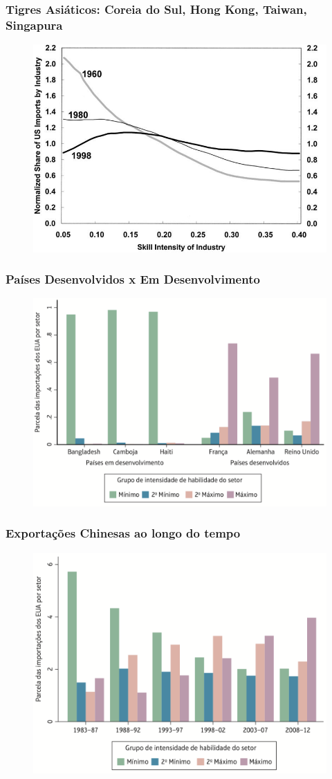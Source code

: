 \documentclass[a4paper,12pt]{article}[abntex2]
\begin{document}
\subsubsection{\textbf{Tigres Asiáticos: Coreia do Sul, Hong Kong, Taiwan, Singapura}}
\begin{figure}[H]
    \centering
    \includegraphics[width=0.7\linewidth]{Imagens/a13i4.png}
\end{figure}

\subsubsection{\textbf{Países Desenvolvidos x Em Desenvolvimento}}
\begin{figure}[H]
    \centering
    \includegraphics[width=0.7\linewidth]{Imagens/a13i5.png}
\end{figure}

\subsubsection{\textbf{Exportações Chinesas ao longo do tempo}}
\begin{figure}[H]
    \centering
    \includegraphics[width=0.7\linewidth]{Imagens/a13i6.png}
\end{figure}
\end{document}
